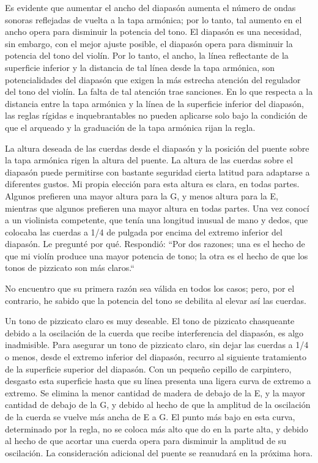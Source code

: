 \documentclass[12pt]{book}
\begin{document}
Es evidente que aumentar el ancho del diapasón aumenta el número de ondas sonoras reflejadas de vuelta a la tapa armónica; por lo tanto, tal aumento en el ancho opera para disminuir la potencia del tono. El diapasón es una necesidad, sin embargo, con el mejor ajuste posible, el diapasón opera para disminuir la potencia del tono del violín. Por lo tanto, el ancho, la línea reflectante de la superficie inferior y la distancia de tal línea desde la tapa armónica, son potencialidades del diapasón que exigen la más estrecha atención del regulador del tono del violín. La falta de tal atención trae sanciones. En lo que respecta a la distancia entre la tapa armónica y la línea de la superficie inferior del diapasón, las reglas rígidas e inquebrantables no pueden aplicarse solo bajo la condición de que el arqueado y la graduación de la tapa armónica rijan la regla.

La altura deseada de las cuerdas desde el diapasón y la posición del puente sobre la tapa armónica rigen la altura del puente. La altura de las cuerdas sobre el diapasón puede permitirse con bastante seguridad cierta latitud para adaptarse a diferentes gustos. Mi propia elección para esta altura es clara, en todas partes. Algunos prefieren una mayor altura para la G, y menos altura para la E, mientras que algunos prefieren una mayor altura en todas partes. Una vez conocí a un violinista competente, que tenía una longitud inusual de mano y dedos, que colocaba las cuerdas a 1/4 de pulgada por encima del extremo inferior del diapasón. Le pregunté por qué. Respondió: ``Por dos razones; una es el hecho de que mi violín produce una mayor potencia de tono; la otra es el hecho de que los tonos de pizzicato son más claros.``

No encuentro que su primera razón sea válida en todos los casos; pero, por el contrario, he sabido que la potencia del tono se debilita al elevar así las cuerdas.

Un tono de pizzicato claro es muy deseable. El tono de pizzicato chasqueante debido a la oscilación de la cuerda que recibe interferencia del diapasón, es algo inadmisible. Para asegurar un tono de pizzicato claro, sin dejar las cuerdas a 1/4 o menos, desde el extremo inferior del diapasón, recurro al siguiente tratamiento de la superficie superior del diapasón. Con un pequeño cepillo de carpintero, desgasto esta superficie hasta que su línea presenta una ligera curva de extremo a extremo. Se elimina la menor cantidad de madera de debajo de la E, y la mayor cantidad de debajo de la G, y debido al hecho de que la amplitud de la oscilación de la cuerda se vuelve más ancha de E a G. El punto más bajo en esta curva, determinado por la regla, no se coloca más alto que do en la parte alta, y debido al hecho de que acortar una cuerda opera para disminuir la amplitud de su oscilación. La consideración adicional del puente se reanudará en la próxima hora.
\end{document}
